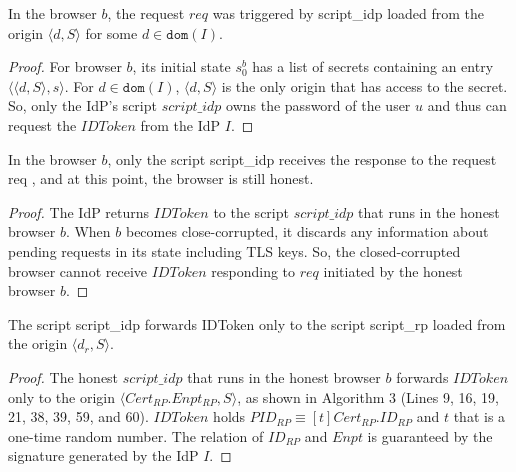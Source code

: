 \begin{lemma}
In the browser $b$, the request $req$ was triggered by script\_idp loaded from the origin $\langle d, S \rangle$ for some $d \in \mathtt{dom}(I)$.
\end{lemma}

\begin{proof}
For browser $b$, its initial state $s^b_0$ has a list of secrets containing an entry $\langle \langle d, S \rangle, s \rangle$. For $d \in \mathtt{dom}(I)$, $\langle d, S \rangle$ is the only origin that has access to the secret. So, only the IdP's script $script\_idp$ owns the password of the user $u$ and thus can request the $IDToken$ from the IdP $I$.
\end{proof}

\begin{lemma}
In the browser $b$, only the script script\_idp receives the response to the request req , and at this point, the browser is still honest.
\end{lemma}

\begin{proof}
The IdP returns $IDToken$ to the script $script\_idp$ that runs in the honest browser $b$. When $b$ becomes close-corrupted, it discards any information about pending requests in its state including TLS keys. So, the closed-corrupted browser cannot receive $IDToken$ responding to $req$ initiated by the honest browser $b$.
\end{proof}

\begin{lemma}
The script script\_idp forwards IDToken only to the script script\_rp loaded from the origin $\langle d_r, S \rangle$.
\end{lemma}

\begin{proof}
The honest $script\_idp$ that runs in the honest browser $b$ forwards $IDToken$ only to the origin $\langle Cert_{RP}.Enpt_{RP}, S \rangle$, as shown in Algorithm 3 %
(Lines 9, 16, 19, 21, 38, 39, 59, and 60). 
$IDToken$ holds $PID_{RP} \equiv [t]Cert_{RP}.ID_{RP}$ and $t$ that is a one-time random number. The relation of $ID_{RP}$ and $Enpt$ is guaranteed by the signature generated by the IdP $I$. 
\end{proof}

